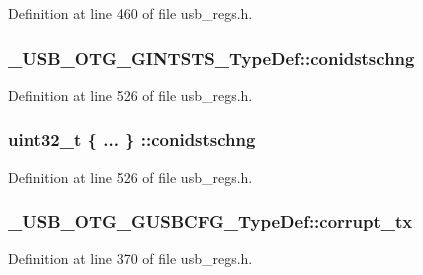 Definition at line 460 of file usb\-\_\-regs.\-h.

\hypertarget{group___u_s_b___o_t_g___d_r_i_v_e_r_ga3cccb37fe1af0f5b089d3f92a8eb36c0}{
\subsubsection[{conidstschng}]{ \-\_\-\-U\-S\-B\-\_\-\-O\-T\-G\-\_\-\-G\-I\-N\-T\-S\-T\-S\-\_\-\-Type\-Def\-::conidstschng}}\label{group___u_s_b___o_t_g___d_r_i_v_e_r_ga3cccb37fe1af0f5b089d3f92a8eb36c0}


Definition at line 526 of file usb\-\_\-regs.\-h.

\hypertarget{group___u_s_b___o_t_g___d_r_i_v_e_r_gaf13e94af5f5846cd384ff0113f153a35}{
\subsubsection[{conidstschng}]{\setlength{\rightskip}{0pt plus 5cm}uint32\-\_\-t \{ ... \} \-::conidstschng}}\label{group___u_s_b___o_t_g___d_r_i_v_e_r_gaf13e94af5f5846cd384ff0113f153a35}


Definition at line 526 of file usb\-\_\-regs.\-h.

\hypertarget{group___u_s_b___o_t_g___d_r_i_v_e_r_gad8162e80af3e0626d1a713bf558ead0a}{
\subsubsection[{corrupt\-\_\-tx}]{ \-\_\-\-U\-S\-B\-\_\-\-O\-T\-G\-\_\-\-G\-U\-S\-B\-C\-F\-G\-\_\-\-Type\-Def\-::corrupt\-\_\-tx}}\label{group___u_s_b___o_t_g___d_r_i_v_e_r_gad8162e80af3e0626d1a713bf558ead0a}


Definition at line 370 of file usb\-\_\-regs.\-h.

